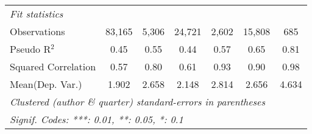 \begin{tabular}{lcccccc}
   \midrule
   \emph{Fit statistics}\\
   Observations                                               & 83,165        & 5,306          & 24,721       & 2,602   & 15,808        & 685\\  
   Pseudo R$^2$                                               & 0.45          & 0.55           & 0.44         & 0.57    & 0.65          & 0.81\\  
   Squared Correlation                                        & 0.57          & 0.80           & 0.61         & 0.93    & 0.90          & 0.98\\  
Mean(Dep. Var.) & 1.902 & 2.658 & 2.148 & 2.814 & 2.656 & 4.634 \\
   \midrule \midrule
   \multicolumn{7}{l}{\emph{Clustered (author \& quarter) standard-errors in parentheses}}\\
   \multicolumn{7}{l}{\emph{Signif. Codes: ***: 0.01, **: 0.05, *: 0.1}}\\
\end{tabular}
\par\endgroup
